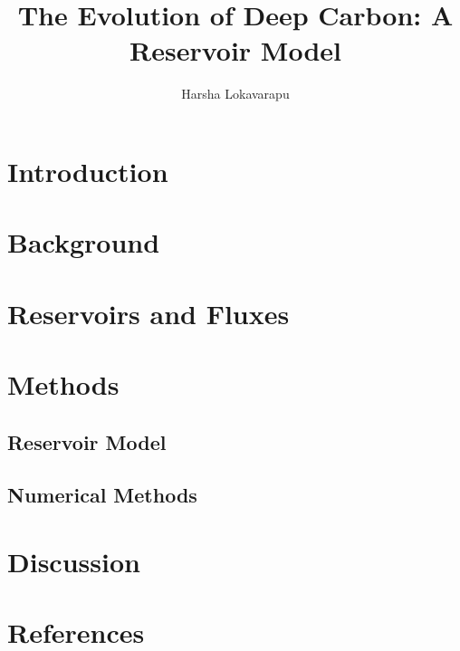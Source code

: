 \documentclass[review]{elsarticle}
\begin{document}
\begin{frontmatter}
\title{\textbf{The Evolution of Deep Carbon: A Reservoir Model}}
\address[address1]{Department of Earth and Planetary Sciences, University of California, Davis, CA 95616, USA}

\author[address1]{Harsha Lokavarapu }

\date{}
\begin{abstract}

\end{abstract}
\end{frontmatter}

\section{Introduction}


\section{Background}


\section{Reservoirs and Fluxes}


\section{Methods}
\subsection{Reservoir Model}


\subsection{Numerical Methods}


\section{Discussion}


\newpage
\section*{References}
 

\end{document}
